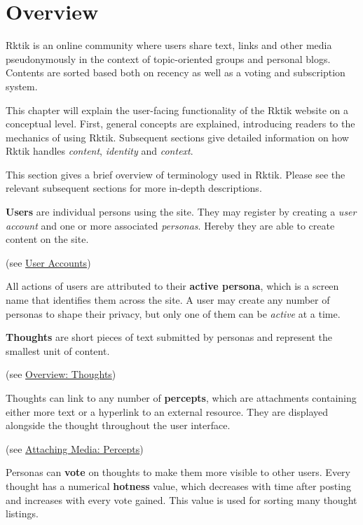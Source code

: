 \section{Overview}\label{overview}

Rktik is an online community where users share text, links and other
media pseudonymously in the context of topic-oriented groups and
personal blogs. Contents are sorted based both on recency as well as a
voting and subscription system.

This chapter will explain the user-facing functionality of the Rktik
website on a conceptual level. First, general concepts are explained,
introducing readers to the mechanics of using Rktik. Subsequent sections
give detailed information on how Rktik handles \emph{content},
\emph{identity} and \emph{context}.


This section gives a brief overview of terminology used in Rktik. Please
see the relevant subsequent sections for more in-depth descriptions.

\textbf{Users} are individual persons using the site. They may register
by creating a \emph{user account} and one or more associated
\emph{personas}. Hereby they are able to create content on the site.

(see \hyperref[user-accounts]{User Accounts})

All actions of users are attributed to their \textbf{active persona},
which is a screen name that identifies them across the site. A user may
create any number of personas to shape their privacy, but only one of
them can be \emph{active} at a time.

\textbf{Thoughts} are short pieces of text submitted by personas and
represent the smallest unit of content.

(see \hyperref[overview-thoughts]{Overview: Thoughts})

Thoughts can link to any number of \textbf{percepts}, which are
attachments containing either more text or a hyperlink to an external
resource. They are displayed alongside the thought throughout the user
interface.

(see \hyperref[attaching-media-percepts]{Attaching Media: Percepts})

Personas can \textbf{vote} on thoughts to make them more visible to
other users. Every thought has a numerical \textbf{hotness} value, which
decreases with time after posting and increases with every vote gained.
This value is used for sorting many thought listings.

